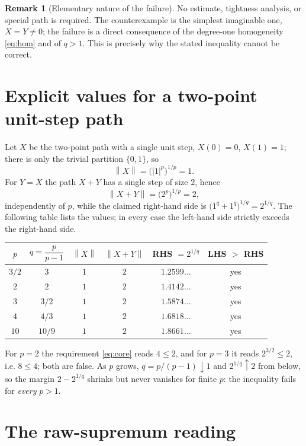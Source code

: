 \documentclass[11pt]{article}
\theoremstyle{definition}
\newtheorem{remark}[theorem]{Remark}
\newcommand{\norm}[1]{\left\lVert #1 \right\rVert}
\begin{document}
\begin{remark}[Elementary nature of the failure]
No estimate, tightness analysis, or special path is required.  The
counterexample is the simplest imaginable one, $X = Y \neq 0$; the failure is
a direct consequence of the degree-one homogeneity \eqref{eq:hom} and of
$q > 1$.  This is precisely why the stated inequality cannot be correct.
\end{remark}

\section{Explicit values for a two-point unit-step path}

Let $X$ be the two-point path with a single unit step, $X(0) = 0$,
$X(1) = 1$; there is only the trivial partition $\{0,1\}$, so
\[
  \norm{X} = \bigl( |1|^{p} \bigr)^{1/p} = 1 .
\]
For $Y = X$ the path $X+Y$ has a single step of size $2$, hence
\[
  \norm{X+Y} = \bigl( 2^{p} \bigr)^{1/p} = 2 ,
\]
independently of $p$, while the claimed right-hand side is
$\bigl(1^{q} + 1^{q}\bigr)^{1/q} = 2^{1/q}$.  The following table lists the
values; in every case the left-hand side strictly exceeds the right-hand
side.

\begin{center}
\begin{tabular}{c c c c c c}
\hline
$p$ & $q = \dfrac{p}{p-1}$ & $\norm{X}$ & $\norm{X+Y}$ & RHS $= 2^{1/q}$ & LHS $>$ RHS \\
\hline
$3/2$ & $3$      & $1$ & $2$ & $1.2599\ldots$ & yes \\
$2$   & $2$      & $1$ & $2$ & $1.4142\ldots$ & yes \\
$3$   & $3/2$    & $1$ & $2$ & $1.5874\ldots$ & yes \\
$4$   & $4/3$    & $1$ & $2$ & $1.6818\ldots$ & yes \\
$10$  & $10/9$   & $1$ & $2$ & $1.8661\ldots$ & yes \\
\hline
\end{tabular}
\end{center}

For $p = 2$ the requirement \eqref{eq:core} reads $4 \le 2$, and for $p = 3$
it reads $2^{3/2} \le 2$, i.e. $8 \le 4$; both are false.  As $p$ grows,
$q = p/(p-1) \downarrow 1$ and $2^{1/q} \uparrow 2$ from below, so the
margin $2 - 2^{1/q}$ shrinks but never vanishes for finite $p$: the
inequality fails for \emph{every} $p > 1$.

\section{The raw-supremum reading}
\end{document}
